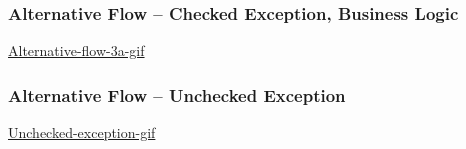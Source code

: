 \documentclass[a4paper]{scrreprt}
\begin{document}
\subsubsection*{Alternative Flow -- Checked Exception, Business Logic}
\href{https://github.com/VincentFerrigan/kth-iv1350-object-oriented-design#alternative-flow---checked-exception-business-logic}{Alternative-flow-3a-gif}

\subsubsection*{Alternative Flow -- Unchecked Exception}
\href{https://github.com/VincentFerrigan/kth-iv1350-object-oriented-design#alternative-flow---unchecked-exception}{Unchecked-exception-gif}

%
%
\end{document}
